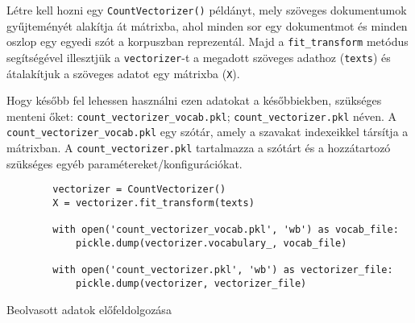 \newpage
\begin{flushleft}
    Létre kell hozni egy \verb|CountVectorizer()| példányt, mely szöveges dokumentumok gyűjteményét alakítja át mátrixba, ahol minden sor egy dokumentmot és minden oszlop egy egyedi szót a korpuszban reprezentál. Majd a \verb|fit_transform| metódus segítségével illesztjük a \verb|vectorizer|-t a megadott szöveges adathoz (\verb|texts|) és átalakítjuk a szöveges adatot egy mátrixba (\verb|X|).
\end{flushleft}
\begin{flushleft}
    Hogy később fel lehessen használni ezen adatokat a későbbiekben, szükséges menteni őket: \verb|count_vectorizer_vocab.pkl|; \verb|count_vectorizer.pkl| néven. A \verb|count_vectorizer_vocab.pkl| egy szótár, amely a szavakat indexeikkel társítja a mátrixban. A \verb|count_vectorizer.pkl| tartalmazza a szótárt és a hozzátartozó szükséges egyéb paramétereket/konfigurációkat.
\end{flushleft}
\begin{listing}[H]
    \begin{verbatim}
        vectorizer = CountVectorizer()
        X = vectorizer.fit_transform(texts)

        with open('count_vectorizer_vocab.pkl', 'wb') as vocab_file:
            pickle.dump(vectorizer.vocabulary_, vocab_file)

        with open('count_vectorizer.pkl', 'wb') as vectorizer_file:
            pickle.dump(vectorizer, vectorizer_file)
    \end{verbatim}
    \caption{Beolvasott adatok előfeldolgozása}
    \label{code:data_pre}
\end{listing}

